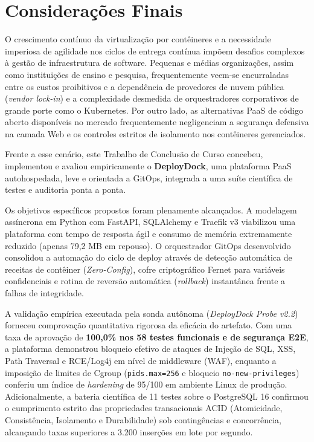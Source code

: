 
\section{Considerações Finais}
\label{sec:consideracoes}

O crescimento contínuo da virtualização por contêineres e a necessidade imperiosa de agilidade nos ciclos de entrega contínua impõem desafios complexos à gestão de infraestrutura de software. Pequenas e médias organizações, assim como instituições de ensino e pesquisa, frequentemente veem-se encurraladas entre os custos proibitivos e a dependência de provedores de nuvem pública (\textit{vendor lock-in}) e a complexidade desmedida de orquestradores corporativos de grande porte como o Kubernetes. Por outro lado, as alternativas PaaS de código aberto disponíveis no mercado frequentemente negligenciam a segurança defensiva na camada Web e os controles estritos de isolamento nos contêineres gerenciados.

Frente a esse cenário, este Trabalho de Conclusão de Curso concebeu, implementou e avaliou empiricamente o \textbf{DeployDock}, uma plataforma PaaS autohospedada, leve e orientada a GitOps, integrada a uma suíte científica de testes e auditoria ponta a ponta.

Os objetivos específicos propostos foram plenamente alcançados. A modelagem assíncrona em Python com FastAPI, SQLAlchemy e Traefik v3 viabilizou uma plataforma com tempo de resposta ágil e consumo de memória extremamente reduzido (apenas 79,2 MB em repouso). O orquestrador GitOps desenvolvido consolidou a automação do ciclo de deploy através de detecção automática de receitas de contêiner (\textit{Zero-Config}), cofre criptográfico Fernet para variáveis confidenciais e rotina de reversão automática (\textit{rollback}) instantânea frente a falhas de integridade.

A validação empírica executada pela sonda autônoma (\textit{DeployDock Probe v2.2}) forneceu comprovação quantitativa rigorosa da eficácia do artefato. Com uma taxa de aprovação de \textbf{100,0\% nos 58 testes funcionais e de segurança E2E}, a plataforma demonstrou bloqueio efetivo de ataques de Injeção de SQL, XSS, Path Traversal e RCE/Log4j em nível de middleware (WAF), enquanto a imposição de limites de Cgroup (\texttt{pids.max=256} e bloqueio \texttt{no-new-privileges}) conferiu um índice de \textit{hardening} de 95/100 em ambiente Linux de produção. Adicionalmente, a bateria científica de 11 testes sobre o PostgreSQL 16 confirmou o cumprimento estrito das propriedades transacionais ACID (Atomicidade, Consistência, Isolamento e Durabilidade) sob contingências e concorrência, alcançando taxas superiores a 3.200 inserções em lote por segundo.


